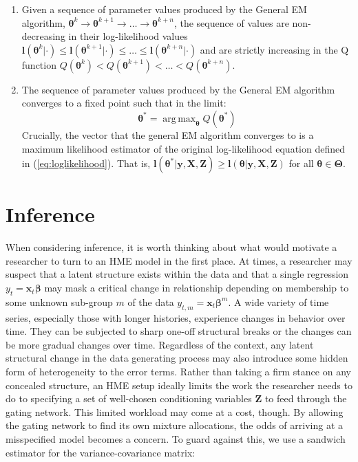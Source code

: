 \documentclass[12pt]{article}
\DeclareMathOperator*{\argmax}{arg\,max}
\begin{document}
\begin{enumerate}
  \item Given a sequence of parameter values produced by the General EM algorithm,
  $\boldsymbol{\theta}^{k} \rightarrow \boldsymbol{\theta}^{k+1} \rightarrow \ldots \rightarrow \boldsymbol{\theta}^{k+n}$,
  the sequence of values are non-decreasing in their log-likelihood values
  $\boldsymbol{l}(\boldsymbol{\theta}^{k}| \cdot) \leq \boldsymbol{l}(\boldsymbol{\theta}^{k+1}| \cdot) \leq \ldots \leq \boldsymbol{l}(\boldsymbol{\theta}^{k+n}| \cdot)$
  and are strictly increasing in the Q function $Q(\boldsymbol{\theta}^{k}) < Q(\boldsymbol{\theta}^{k+1}) < \ldots < Q(\boldsymbol{\theta}^{k+n})$.

  \item The sequence of parameter values produced by the General EM algorithm
  converges to a fixed point such that in the limit:
    \begin{equation}
      \boldsymbol{\theta}^{*}  = \argmax_{\boldsymbol{\theta}} Q(\boldsymbol{\theta}^{*})
    \end{equation}
  Crucially, the vector that the general EM algorithm converges
  to is a maximum likelihood estimator of the original log-likelihood equation
  defined in (\ref{eq:loglikelihood}). That is, 
  $\boldsymbol{l}(\boldsymbol{\theta}^{*}| \boldsymbol{y}, \boldsymbol{X}, \boldsymbol{Z}) \geq \boldsymbol{l}(\boldsymbol{\theta}| \boldsymbol{y}, \boldsymbol{X}, \boldsymbol{Z})$
  for all $\boldsymbol{\theta} \in \boldsymbol{\Theta}$.
\end{enumerate}

\section{Inference} \label{sec:Inference}

When considering inference, it is worth thinking about what would motivate
a researcher to turn to an HME model in the first place. At times,
a researcher may suspect that a latent structure exists within the data
and that a single regression $y_{t} = \boldsymbol{x}_{t} \boldsymbol{\beta}$
may mask a critical change in relationship depending on membership to
some unknown sub-group $m$ of the data $y_{t,m} = \boldsymbol{x}_{t} \boldsymbol{\beta}^{m}$.
A wide variety of time series, especially those with longer histories,
experience changes in behavior over time. They can be subjected to sharp one-off
structural breaks or the changes can be more gradual changes over time. Regardless of
the context, any latent structural change in the data generating
process may also introduce some hidden form of heterogeneity to the error terms. 
Rather than taking a firm stance on any concealed structure, an HME
setup ideally limits the work the researcher needs to do to specifying
a set of well-chosen conditioning variables $\boldsymbol{Z}$ to feed through the gating
network. This limited workload may come at a cost, though. By allowing the 
gating network to find its own mixture allocations, the odds of arriving at a
misspecified model becomes a concern. To guard against this, we use a sandwich
estimator for the variance-covariance matrix:
\end{document}
